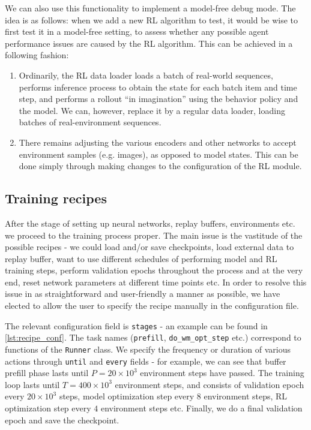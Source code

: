 \documentclass[en]{pracamgr}
\begin{document}
We can also use this functionality to implement a model-free debug mode. The idea is as follows: when we add a new RL algorithm to test, it would be wise to first test it in a model-free setting, to assess whether any possible agent performance issues are caused by the RL algorithm. This can be achieved in a following fashion:

\begin{enumerate}
  \item Ordinarily, the RL data loader loads a batch of real-world sequences, performs inference process to obtain the state for each batch item and time step, and performs a rollout ``in imagination'' using the behavior policy and the model. We can, however, replace it by a regular data loader, loading batches of real-environment sequences.
  \item There remains adjusting the various encoders and other networks to accept environment samples (e.g. images), as opposed to model states. This can be done simply through making changes to the configuration of the RL module.
\end{enumerate}

\subsection{Training recipes}

After the stage of setting up neural networks, replay buffers, environments etc. we proceed to the training process proper. The main issue is the vastitude of the possible recipes - we could load and/or save checkpoints, load external data to replay buffer, want to use different schedules of performing model and RL training steps, perform validation epochs throughout the process and at the very end, reset network parameters at different time points etc. In order to resolve this issue in as straightforward and user-friendly a manner as possible, we have elected to allow the user to specify the recipe manually in the configuration file.

The relevant configuration field is {\tt stages} - an example can be found in \autoref{lst:recipe_conf}. The task names ({\tt prefill}, {\tt do\_wm\_opt\_step} etc.) correspond to functions of the {\tt Runner} class. We specify the frequency or duration of various actions through {\tt until} and {\tt every} fields - for example, we can see that buffer prefill phase lasts until $P = 20 \times 10^3$ environment steps have passed. The training loop lasts until $T = 400 \times 10^3$ environment steps, and consists of validation epoch every $20 \times 10^3$ steps, model optimization step every $8$ environment steps, RL optimization step every $4$ environment steps etc. Finally, we do a final validation epoch and save the checkpoint.
\end{document}
